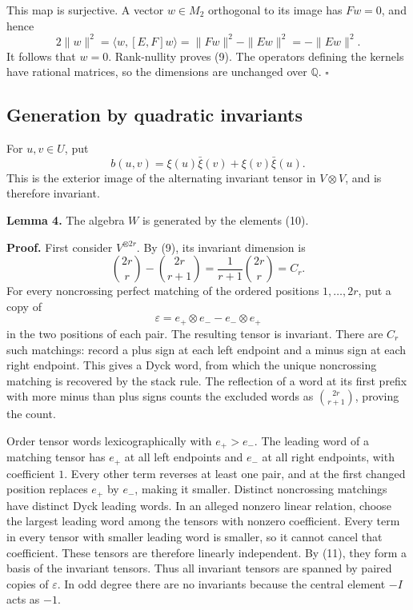\documentclass[11pt]{article}
\begin{document}
This map is surjective. A vector \(w\in M_2\) orthogonal to its image has \(Fw=0\), and hence \[
2\|w\|^2=\langle w,[E,F]w\rangle
=\|Fw\|^2-\|Ew\|^2=-\|Ew\|^2.
\] It follows that \(w=0\). Rank-nullity proves (9). The operators defining the kernels have rational matrices, so the dimensions are unchanged over \(\mathbb Q\). \(\square\)

\subsection{Generation by quadratic invariants}\label{generation-by-quadratic-invariants}

For \(u,v\in U\), put \[
b(u,v)=\xi(u)\bar\xi(v)+\xi(v)\bar\xi(u).
\tag{10}
\] This is the exterior image of the alternating invariant tensor in \(V\otimes V\), and is therefore invariant.

\textbf{Lemma 4.} The algebra \(W\) is generated by the elements (10).

\textbf{Proof.} First consider \(V^{\otimes2r}\). By (9), its invariant dimension is \[
\binom{2r}{r}-\binom{2r}{r+1}
=\frac1{r+1}\binom{2r}{r}=C_r.
\tag{11}
\] For every noncrossing perfect matching of the ordered positions \(1,\ldots,2r\), put a copy of \[
\varepsilon=e_+\otimes e_- - e_-\otimes e_+
\] in the two positions of each pair. The resulting tensor is invariant. There are \(C_r\) such matchings: record a plus sign at each left endpoint and a minus sign at each right endpoint. This gives a Dyck word, from which the unique noncrossing matching is recovered by the stack rule. The reflection of a word at its first prefix with more minus than plus signs counts the excluded words as \(\binom{2r}{r+1}\), proving the count.

Order tensor words lexicographically with \(e_+>e_-\). The leading word of a matching tensor has \(e_+\) at all left endpoints and \(e_-\) at all right endpoints, with coefficient \(1\). Every other term reverses at least one pair, and at the first changed position replaces \(e_+\) by \(e_-\), making it smaller. Distinct noncrossing matchings have distinct Dyck leading words. In an alleged nonzero linear relation, choose the largest leading word among the tensors with nonzero coefficient. Every term in every tensor with smaller leading word is smaller, so it cannot cancel that coefficient. These tensors are therefore linearly independent. By (11), they form a basis of the invariant tensors. Thus all invariant tensors are spanned by paired copies of \(\varepsilon\). In odd degree there are no invariants because the central element \(-I\) acts as \(-1\).
\end{document}
